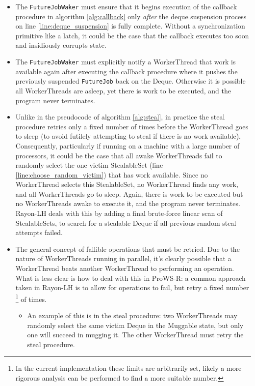 \documentclass[bsc,frontabs,singlespacing,parskip,deptreport,normalheadings]{infthesis}
\begin{document}
\begin{itemize}
    \item The \texttt{FutureJobWaker} must ensure that it begins execution of
        the callback procedure in algorithm \ref{alg:callback} only
        \textit{after} the deque suspension process on line
        \ref{line:deque_suspension} is fully complete. Without a synchronization
        primitive like a latch, it could be the case that the callback executes
        too soon and insidiously corrupts state.
    \item The \texttt{FutureJobWaker} must explicitly notify a WorkerThread that
        work is available again after executing the callback procedure where it
        pushes the previously suspended \texttt{FutureJob} back on the Deque.
        Otherwise it is possible all WorkerThreads are asleep, yet there is work
        to be executed, and the program never terminates.
    \item Unlike in the pseudocode of algorithm \ref{alg:steal}, in practice the
        steal procedure retries only a fixed number of times before the
        WorkerThread goes to sleep (to avoid futilely attempting to steal if
        there is no work available). Consequently, particularly if running on a
        machine with a large number of processors, it could be the case that all
        awake WorkerThreads fail to randomly select the one victim StealableSet
        (line \ref{line:choose_random_victim}) that has work available. Since no
        WorkerThread selects this StealableSet, no WorkerThread finds any work,
        and all WorkerThreads go to sleep. Again, there is work to be executed
        but no WorkerThreads awake to execute it, and the program never
        terminates. Rayon-LH deals with this by adding a final brute-force
        linear scan of StealableSets, to search for a stealable Deque if all
        previous random steal attempts failed.
    \item The general concept of fallible operations that must be retried. Due
        to the nature of WorkerThreads running in parallel, it's clearly
        possible that a WorkerThread beats another WorkerThread to performing an
        operation. What is less clear is how to deal with this in ProWS-R: a
        common approach taken in Rayon-LH is to allow for operations to fail,
        but retry a fixed number \footnote{In the current implementation these
        limits are arbitrarily set, likely a more rigorous analysis can be
        performed to find a more suitable number.} of times.
    \begin{itemize}
        \item An example of this is in the steal procedure: two WorkerThreads
            may randomly select the same victim Deque in the Muggable state, but
            only one will succeed in mugging it. The other WorkerThread must
            retry the steal procedure.
    \end{itemize}
\end{itemize}
\end{document}
